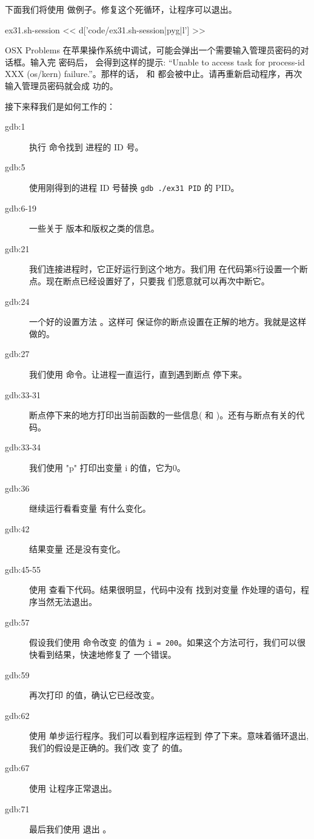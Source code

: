 \begin{enumerate}
下面我们将使用  做例子。修复这个死循环，让程序可以退出。
\begin{code}{ex31.sh-session}
<< d['code/ex31.sh-session|pyg|l'] >>
\end{code}

\begin{aside}{OSX Problems}
在苹果操作系统中调试，可能会弹出一个需要输入管理员密码的对话框。输入完
密码后，  会得到这样的提示: “Unable to access task for
process-id XXX (os/kern) failure.”。那样的话， 和
 都会被中止。请再重新启动程序，再次输入管理员密码就会成
功的。
\end{aside}

接下来释我们是如何工作的：

\begin{description}
\item[gdb:1] 执行  命令找到  进程的 ID 号。
\item[gdb:5] 使用刚得到的进程 ID 号替换 \verb|gdb ./ex31 PID| 的 PID。
\item[gdb:6-19] 一些关于  版本和版权之类的信息。
\item[gdb:21] 我们连接进程时，它正好运行到这个地方。我们用
   在代码第8行设置一个断点。现在断点已经设置好了，只要我
  们愿意就可以再次中断它。
\item[gdb:24] 一个好的设置方法 。这样可
  保证你的断点设置在正解的地方。我就是这样做的。
\item[gdb:27] 我们使用  命令。让进程一直运行，直到遇到断点
  停下来。
\item[gdb:33-31] 断点停下来的地方打印出当前函数的一些信息(
  和 )。还有与断点有关的代码。
\item[gdb:33-34] 我们使用  "p" 打印出变量 i 的值，它为0。
\item[gdb:36] 继续运行看看变量  有什么变化。
\item[gdb:42] 结果变量  还是没有变化。
\item[gdb:45-55] 使用  查看下代码。结果很明显，代码中没有
  找到对变量  作处理的语句，程序当然无法退出。
\item[gdb:57] 假设我们使用  命令改变  的值为
  \verb|i = 200|。如果这个方法可行，我们可以很快看到结果，快速地修复了
  一个错误。
\item[gdb:59] 再次打印  的值，确认它已经改变。
\item[gdb:62] 使用  单步运行程序。我们可以看到程序运程到
   停了下来。意味着循环退出,我们的假设是正确的。我们改
  变了  的值。
\item[gdb:67] 使用 让程序正常退出。
\item[gdb:71] 最后我们使用  退出 。
\end{description}



\end{enumerate}
